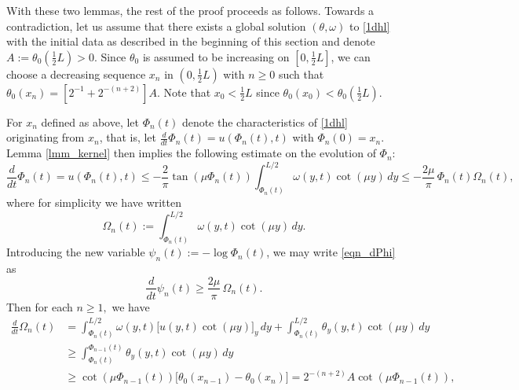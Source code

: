 \documentclass[reqno,centertags, 11pt]{amsart}
\begin{document}
With these two lemmas, the rest of the proof proceeds as follows.
Towards a contradiction, let us assume that there exists a global solution $(\theta,\omega)$ to \eqref{1dhl} with
the initial data as described in the beginning of this section and
 denote $A := \theta_{0}(\frac{1}{2} L) > 0$. Since $\theta_{0}$ is assumed to be increasing on $[0,\frac{1}{2} L]$, we can choose a decreasing sequence $x_{n}$ in $(0,\frac{1}{2} L)$ with
$n \geq 0$ such that $\theta_{0}(x_{n}) = [2^{-1} + 2^{-(n+2)}] A$. Note that $x_{0} < \frac{1}{2} L$ since $\theta_{0}(x_{0}) < \theta_{0}(\frac{1}{2} L)$.

For $x_{n}$ defined as above, let $\Phi_{n}(t)$ denote the characteristics of \eqref{1dhl} originating from $x_{n}$, that is, let $\frac{d}{dt} \Phi_{n}(t) = u(\Phi_{n}(t),t)$ with $\Phi_{n}(0) = x_{n}$.
Lemma \ref{lmm_kernel} then implies the following estimate on the evolution of $\Phi_{n}$:
\begin{equation}
  \frac{d}{dt} \Phi_{n}(t) = u(\Phi_{n}(t),t) \leq -\frac{2}{\pi} \tan(\mu \Phi_{n}(t)) \int_{\Phi_{n}(t)}^{L/2} \omega(y,t) \cot(\mu y)\,dy \leq -\frac{2\mu}{\pi}\, \Phi_{n}(t) \Omega_{n}(t),
  \label{eqn_dPhi}
\end{equation}
where for simplicity we have written
\begin{equation}
  \Omega_{n}(t) := \int_{\Phi_{n}(t)}^{L/2} \omega(y,t) \cot(\mu y)\,dy.
  \label{eqn_def_Omege}
\end{equation}
Introducing the new variable $\psi_{n}(t) := -\log \Phi_{n}(t)$, we may write \eqref{eqn_dPhi} as
\begin{equation}
  \frac{d}{dt} \psi_{n}(t) \geq \frac{2\mu}{\pi}\, \Omega_{n}(t).
  \label{eqn_dpsi}
\end{equation}
Then for each $n \geq 1,$ we have
\begin{align*}
  \frac{d}{dt} \Omega_{n}(t) & = \int_{\Phi_{n}(t)}^{L/2} \omega(y,t) \bigl[ u(y,t) \cot(\mu y) \bigr]_{y}\,dy + \int_{\Phi_{n}(t)}^{L/2} \theta_{y}(y,t) \cot(\mu y)\,dy \\
  & \geq \int_{\Phi_{n}(t)}^{\Phi_{n-1}(t)} \theta_{y}(y,t) \cot(\mu y)\,dy \\
  & \geq \cot(\mu \Phi_{n-1}(t)) \bigl[ \theta_{0}(x_{n-1}) - \theta_{0}(x_{n}) \bigr] = 2^{-(n+2)} A \cot(\mu \Phi_{n-1}(t)),
\end{align*}
\end{document}
